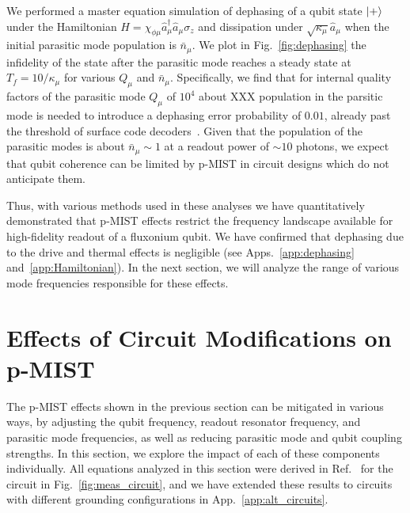 \documentclass[%
reprint,
superscriptaddress,
 amsmath,amssymb,
 aps,
 prx,
longbibliography,
floatfix,
]{revtex4-2}
\begin{document}
We performed a master equation simulation of dephasing of a qubit state $\ket{+}$ under the Hamiltonian $H=\chi_{\phi\mu} \hat a_\mu^\dagger \hat a_\mu \sigma_z$ and dissipation under $\sqrt{\kappa_\mu}\hat a_\mu$ when the initial parasitic mode population is $\bar n_\mu$. We plot in Fig.~\ref{fig:dephasing} the infidelity of the state after the parasitic mode reaches a steady state at $T_f=10/\kappa_\mu$ for various $Q_\mu$ and $\bar n_\mu$. Specifically, we find that for internal quality factors of the parasitic mode $Q_\mu$ of $10^{4}$ about XXX population in the parsitic mode is needed to introduce a dephasing error probability of $0.01$, already past the threshold of surface code decoders~\cite{fowler2012surface}. Given that the population of the parasitic modes is about $\bar n_\mu\sim 1$ at a readout power of $\sim 10$ photons, we expect that qubit coherence can be limited by p-MIST in circuit designs which do not anticipate them. 


Thus, with various methods used in these analyses we have quantitatively demonstrated that p-MIST effects restrict the frequency landscape available for high-fidelity readout of a fluxonium qubit. We have confirmed that dephasing due to the drive and thermal effects is negligible (see Apps.~\ref{app:dephasing} and~\ref{app:Hamiltonian}). In the next section, we will analyze the range of various mode frequencies responsible for these effects.

\section{Effects of Circuit Modifications on p-MIST}\label{sec:expressions}
The p-MIST effects shown in the previous section can be mitigated in various ways, by adjusting the qubit frequency, readout resonator frequency, and parasitic mode frequencies, as well as reducing parasitic mode and qubit coupling strengths. In this section, we explore the impact of each of these components individually. All equations analyzed in this section were derived in Ref.~\cite{viola2015collective} for the circuit in Fig.~\ref{fig:meas_circuit}, and we have extended these results to circuits with different grounding configurations in App.~\ref{app:alt_circuits}.
\end{document}
